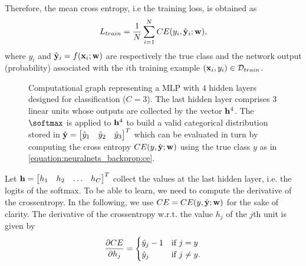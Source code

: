 \documentclass[letterpaper,10pt,english]{jupyterBook}
\let\sphinxpxdimen\pdfpxdimen\else\newdimen\sphinxpxdimen
\begin{document}
\sphinxAtStartPar
Therefore, the mean cross entropy, i.e the training loss, is obtained as
\label{equation:neuralnets_backprop:9305918d-5456-4423-bcfd-5a12debfc06e}\begin{equation}
L_{train} =  {1 \over N} \sum_{i=1}^{N} CE(y_{i}, \hat{\bf y}_{i}; {\bf w}),
\end{equation}
\sphinxAtStartPar
where \( y_{i} \) and \( \hat{\bf y}_{i} = f({\bf x}_{i}; {\bf w})\) are respectively the true class and the network output (probability) associated with the \(i\)\sphinxhyphen{}th training example \( \left({\bf x}_{i}, y_{i} \right) \in {\cal D}_{train} \).


\begin{figure}
\centering
\noindent\sphinxincludegraphics[height=320\sphinxpxdimen]{{MLP_CE_04}.png}
\caption{Computational graph representing a MLP with \(4\) hidden layers designed for classification (\(C=3\)). The last hidden layer comprises \(3\) linear units whose outputs are collected by the vector \( {\bf h}^{4} \). The \(\softmax\) is applied to \( {\bf h}^{4} \) to build a valid categorical distribution stored in \( \hat{\bf y} = \begin{bmatrix} \hat{y}_{1} & \hat{y}_{2} & \hat{y}_{3} \end{bmatrix}^{T} \) which can be evaluated in turn by computing the cross entropy \( CE(y, \hat{\bf y}; {\bf w}) \) using the true class \( y \) as in \eqref{equation:neuralnets_backprop:ce}.}\label{\detokenize{neuralnets_backprop:ce-fig}}\end{figure}

\sphinxAtStartPar
Let \( {\bf h} = \begin{bmatrix} h_1 & h_2 & \ldots & h_C \end{bmatrix}^{T} \) collect the values at the last hidden layer, i.e. the logits of the softmax. To be able to learn, we need to compute the derivative of the cross\sphinxhyphen{}entropy. In the following, we use \( CE = CE(y, \hat{\bf y}; {\bf w}) \) for the sake of clarity. The derivative of the cross\sphinxhyphen{}entropy w.r.t. the value \( h_j \) of the \(j\)\sphinxhyphen{}th unit is given by
\begin{align*}
{\partial CE \over \partial h_j} =
\begin{cases}
 \hat{y}_j - 1   & \text{if } j=y \\
 \hat{y}_j  & \text{if } j\not=y.
\end{cases}
\end{align*}
\end{document}
